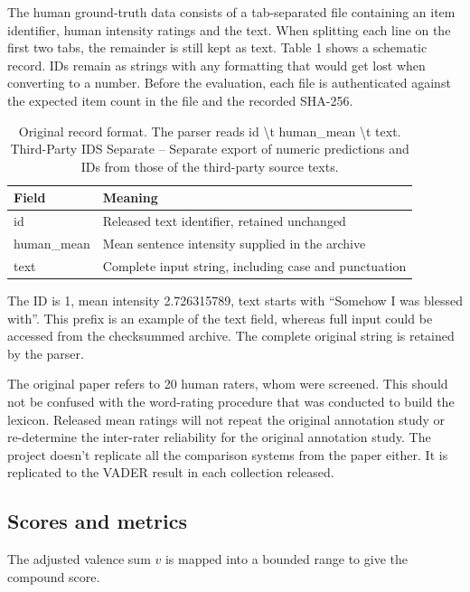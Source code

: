 \documentclass[11pt]{article}
\begin{document}
The human ground-truth data consists of a tab-separated file containing an item identifier, human intensity ratings and the text. When splitting each line on the first two tabs, the remainder is still kept as text. Table 1 shows a schematic record. IDs remain as strings with any formatting that would get lost when converting to a number. Before the evaluation, each file is authenticated against the expected item count in the file and the recorded SHA-256.


\begin{table}[t]
\centering\small
\setlength{\tabcolsep}{5pt}
\begin{tabularx}{\columnwidth}{@{}lX@{}}
\toprule
Field & Meaning\\
\midrule
id & Released text identifier, retained unchanged\\
human\_mean & Mean sentence intensity supplied in the archive\\
text & Complete input string, including case and punctuation\\
\bottomrule
\end{tabularx}
\caption{Original record format. The parser reads id \textbackslash{}t human\_mean \textbackslash{}t text. Third-Party IDS Separate -- Separate export of numeric predictions and IDs from those of the third-party source texts.}
\label{tab:user1}
\end{table}

The ID is 1, mean intensity 2.726315789, text starts with ``Somehow I was blessed with''. This prefix is an example of the text field, whereas full input could be accessed from the checksummed archive. The complete original string is retained by the parser.


The original paper refers to 20 human raters, whom were screened. This should not be confused with the word-rating procedure that was conducted to build the lexicon. Released mean ratings will not repeat the original annotation study or re-determine the inter-rater reliability for the original annotation study. The project doesn't replicate all the comparison systems from the paper either. It is replicated to the VADER result in each collection released.


\subsection{Scores and metrics}

The adjusted valence sum $v$ is mapped into a bounded range to give the compound score.
\end{document}
